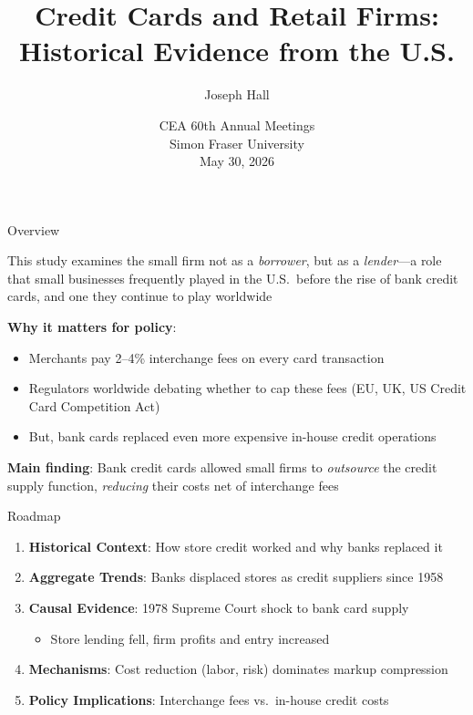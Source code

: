 \documentclass[11pt, aspectratio=169]{beamer}
\title{Credit Cards and Retail Firms: \newline
Historical Evidence from the U.S.}
\author{Joseph Hall}
\date{CEA 60th Annual Meetings \\ Simon Fraser University \\ May 30, 2026}
\institute{Georgia Institute of Technology}
\begin{document}
\bgroup
\makeatletter
{}
\makeatother
\begin{frame}
\titlepage
\end{frame}
\egroup

\setcounter{framenumber}{0}


\begin{frame}{Overview}

This study examines the small firm not as a \emph{borrower}, but as a \emph{lender}---a role that small businesses frequently played in the U.S.\ before the rise of bank credit cards, and one they continue to play worldwide

\vfill

\textbf{Why it matters for policy}:
\begin{itemize}
    \item Merchants pay 2--4\% interchange fees on every card transaction
    \item Regulators worldwide debating whether to cap these fees (EU, UK, US Credit Card Competition Act)
    \item But, bank cards replaced even more expensive in-house credit operations
\end{itemize}

\vfill

\textbf{Main finding}: Bank credit cards allowed small firms to \emph{outsource} the credit supply function, \emph{reducing} their costs net of interchange fees

\end{frame}


\begin{frame}{Roadmap}

\begin{enumerate}
    \item \textbf{Historical Context}: How store credit worked and why banks replaced it
    \vfill
    \item \textbf{Aggregate Trends}: Banks displaced stores as credit suppliers since 1958
    \vfill
    \item \textbf{Causal Evidence}: 1978 Supreme Court shock to bank card supply
    \begin{itemize}
        \item Store lending fell, firm profits and entry increased
    \end{itemize}
    \vfill
    \item \textbf{Mechanisms}: Cost reduction (labor, risk) dominates markup compression
    \vfill
    \item \textbf{Policy Implications}: Interchange fees vs.\ in-house credit costs
\end{enumerate}

\end{frame}
\end{document}
